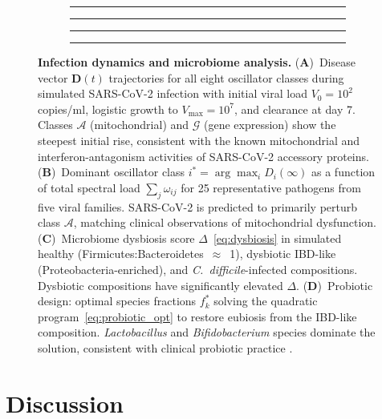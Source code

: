\documentclass[twocolumn,11pt,a4paper]{article}
\theoremstyle{definition}
\theoremstyle{remark}
\begin{document}
\begin{figure}[t]
\centering
\begin{subfigure}[b]{0.23\textwidth}
  \rule{\textwidth}{0.6\textwidth}
  \caption{}
  \label{fig:dyn_trajectory}
\end{subfigure}
\hfill
\begin{subfigure}[b]{0.23\textwidth}
  \rule{\textwidth}{0.6\textwidth}
  \caption{}
  \label{fig:dyn_dominant}
\end{subfigure}
\hfill
\begin{subfigure}[b]{0.23\textwidth}
  \rule{\textwidth}{0.6\textwidth}
  \caption{}
  \label{fig:micro_dysbiosis}
\end{subfigure}
\hfill
\begin{subfigure}[b]{0.23\textwidth}
  \rule{\textwidth}{0.6\textwidth}
  \caption{}
  \label{fig:micro_probiotic}
\end{subfigure}
\caption{\textbf{Infection dynamics and microbiome analysis.}
(\textbf{A})~Disease vector $\mathbf{D}(t)$ trajectories for all eight
oscillator classes during simulated SARS-CoV-2 infection with initial viral
load $V_0 = 10^2$ copies/ml, logistic growth to $V_{\max} = 10^7$, and
clearance at day 7. Classes $\mathcal{A}$ (mitochondrial) and $\mathcal{G}$
(gene expression) show the steepest initial rise, consistent with the known
mitochondrial and interferon-antagonism activities of SARS-CoV-2 accessory
proteins.
(\textbf{B})~Dominant oscillator class $i^* = \arg\max_i D_i(\infty)$ as a
function of total spectral load $\sum_j \omega_{ij}$ for 25 representative
pathogens from five viral families. SARS-CoV-2 is predicted to primarily
perturb class $\mathcal{A}$, matching clinical observations of mitochondrial
dysfunction.
(\textbf{C})~Microbiome dysbiosis score $\Delta$~\eqref{eq:dysbiosis} in
simulated healthy (Firmicutes:Bacteroidetes~$\approx$~1), dysbiotic IBD-like
(Proteobacteria-enriched), and \textit{C.~difficile}-infected compositions.
Dysbiotic compositions have significantly elevated $\Delta$.
(\textbf{D})~Probiotic design: optimal species fractions $f_k^*$ solving the
quadratic program~\eqref{eq:probiotic_opt} to restore eubiosis from the
IBD-like composition. \textit{Lactobacillus} and \textit{Bifidobacterium}
species dominate the solution, consistent with clinical probiotic practice
\citep{turnbaugh2006}.}
\label{fig:dynamics}
\end{figure}

\section{Discussion}
\label{sec:discussion}
\end{document}
